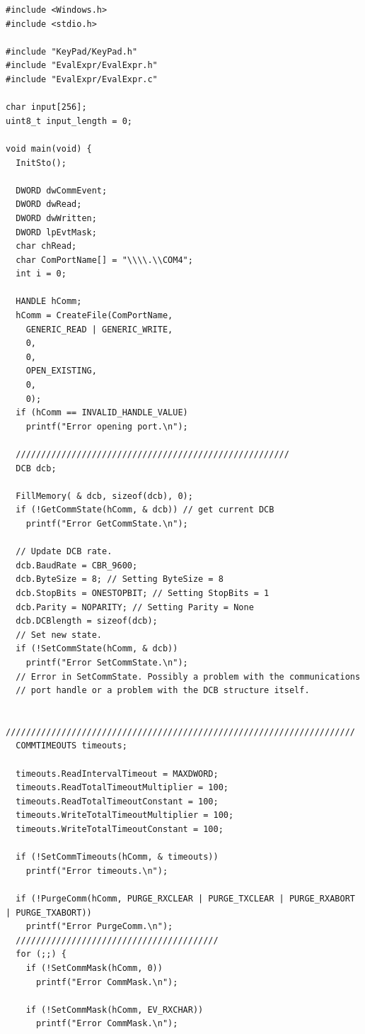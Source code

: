 \documentclass[a4paper, twoside]{report}
\begin{document}
\begin{verbatim}
#include <Windows.h>
#include <stdio.h>

#include "KeyPad/KeyPad.h"
#include "EvalExpr/EvalExpr.h"
#include "EvalExpr/EvalExpr.c"

char input[256];
uint8_t input_length = 0;

void main(void) {
  InitSto();

  DWORD dwCommEvent;
  DWORD dwRead;
  DWORD dwWritten;
  DWORD lpEvtMask;
  char chRead;
  char ComPortName[] = "\\\\.\\COM4";
  int i = 0;

  HANDLE hComm;
  hComm = CreateFile(ComPortName,
    GENERIC_READ | GENERIC_WRITE,
    0,
    0,
    OPEN_EXISTING,
    0,
    0);
  if (hComm == INVALID_HANDLE_VALUE)
    printf("Error opening port.\n");

  //////////////////////////////////////////////////////
  DCB dcb;

  FillMemory( & dcb, sizeof(dcb), 0);
  if (!GetCommState(hComm, & dcb)) // get current DCB
    printf("Error GetCommState.\n");

  // Update DCB rate.
  dcb.BaudRate = CBR_9600;
  dcb.ByteSize = 8; // Setting ByteSize = 8
  dcb.StopBits = ONESTOPBIT; // Setting StopBits = 1
  dcb.Parity = NOPARITY; // Setting Parity = None
  dcb.DCBlength = sizeof(dcb);
  // Set new state.
  if (!SetCommState(hComm, & dcb))
    printf("Error SetCommState.\n");
  // Error in SetCommState. Possibly a problem with the communications
  // port handle or a problem with the DCB structure itself.

  /////////////////////////////////////////////////////////////////////
  COMMTIMEOUTS timeouts;

  timeouts.ReadIntervalTimeout = MAXDWORD;
  timeouts.ReadTotalTimeoutMultiplier = 100;
  timeouts.ReadTotalTimeoutConstant = 100;
  timeouts.WriteTotalTimeoutMultiplier = 100;
  timeouts.WriteTotalTimeoutConstant = 100;

  if (!SetCommTimeouts(hComm, & timeouts))
    printf("Error timeouts.\n");

  if (!PurgeComm(hComm, PURGE_RXCLEAR | PURGE_TXCLEAR | PURGE_RXABORT | PURGE_TXABORT))
    printf("Error PurgeComm.\n");
  ////////////////////////////////////////
  for (;;) {
    if (!SetCommMask(hComm, 0))
      printf("Error CommMask.\n");

    if (!SetCommMask(hComm, EV_RXCHAR))
      printf("Error CommMask.\n");


\end{verbatim}
\end{document}
